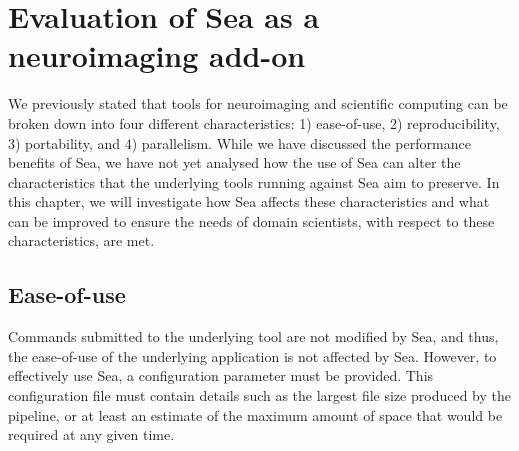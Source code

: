 \chapter{Evaluation of Sea as a neuroimaging add-on}

We previously stated that tools for neuroimaging and scientific computing can be broken down into four different
characteristics: 1) ease-of-use, 2) reproducibility,
3) portability, and 4) parallelism. While we have discussed the performance benefits of Sea, we have not yet analysed how
the use of Sea can alter the characteristics that the underlying tools running against Sea aim to preserve. In this chapter,
we will investigate how Sea affects these characteristics and what can be improved to ensure the needs of domain scientists,
with respect to these characteristics, are met.


\section{Ease-of-use}
Commands submitted to the underlying tool are not modified by Sea, and thus, the ease-of-use of the underlying application is 
not affected by Sea. However, to effectively use Sea, a configuration parameter must be provided. This configuration file
must contain details such as the largest file size produced by the pipeline, or at least an estimate of the maximum amount of space
that would be required at any given time. 